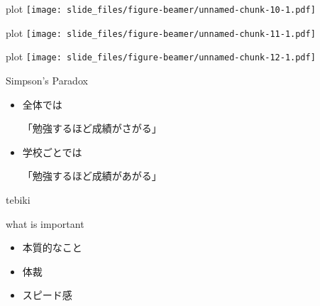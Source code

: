 \documentclass[
  ignorenonframetext,
]{beamer}
\providecommand{\tightlist}{%
  \setlength{\itemsep}{0pt}\setlength{\parskip}{0pt}}
\begin{document}
\begin{frame}{plot}
\protect\hypertarget{plot-5}{}
\texttt{[image: slide\_files/figure-beamer/unnamed-chunk-10-1.pdf]}
\end{frame}

\begin{frame}{plot}
\protect\hypertarget{plot-6}{}
\texttt{[image: slide\_files/figure-beamer/unnamed-chunk-11-1.pdf]}
\end{frame}

\begin{frame}{plot}
\protect\hypertarget{plot-7}{}
\texttt{[image: slide\_files/figure-beamer/unnamed-chunk-12-1.pdf]}
\end{frame}

\begin{frame}{Simpson's Paradox}
\protect\hypertarget{simpsons-paradox}{}
\LARGE

\begin{itemize}[<+->]
\tightlist
\item
  \textbullet{}\hspace{2pt}全体では

  \par

  「勉強するほど成績がさがる」 \bigskip
\item
  \textbullet{}\hspace{2pt}学校ごとでは

  \par

  「勉強するほど成績があがる」
\end{itemize}

\normalsize
\end{frame}

\begin{frame}{tebiki}
\protect\hypertarget{tebiki}{}
\vspace*{-20pt}
\end{frame}

\begin{frame}{what is important}
\protect\hypertarget{what-is-important}{}
\Huge

\begin{itemize}[<+->]
\tightlist
\item
  \textbullet{}\hspace{2pt}本質的なこと \bigskip
\item
  \textbullet{}\hspace{2pt}体裁 \bigskip
\item
  \textbullet{}\hspace{2pt}スピード感
\end{itemize}
\end{frame}
\end{document}
